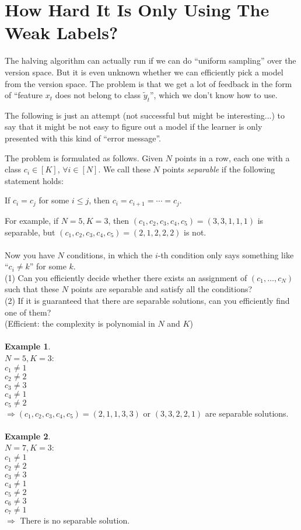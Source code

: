 \documentclass{article}
\begin{document}
\section{How Hard It Is Only Using The Weak Labels?}
The halving algorithm can actually run if we can do ``uniform sampling'' over the version space. But it is even unknown whether we can efficiently pick a model from the version space. The problem is that we get a lot of feedback in the form of ``feature $x_t$ does not belong to class $\tilde{y}_t$'', which we don't know how to use. 

The following is just an attempt (not successful but might be interesting...) to say that it might be not easy to figure out a model if the learner is only presented with this kind of ``error message''. 

The problem is formulated as follows. 
Given $N$ points in a row, each one with a class $c_i\in [K]$, $\forall i\in [N]$. We call these $N$ points \textit{separable} if the following statement holds: 
\begin{center}
    If $c_i=c_j$ for some $i\leq j$, then $c_i=c_{i+1}=\cdots=c_j$.
\end{center}
For example, if $N=5, K=3$, then $(c_1,c_2, c_3, c_4,c_5)=(3,3,1,1,1)$ is separable, but $(c_1,c_2,c_3,c_4,c_5)=(2,1,2,2,2)$ is not. 
\ \\
\ \\
Now you have $N$ conditions, in which the $i$-th condition only says something like ``$c_i\neq k$'' for some $k$. \\
(1) Can you efficiently decide whether there exists an assignment of $(c_1,\ldots,c_N)$ such that these $N$ points are separable and satisfy all the conditions? \\
(2) If it is guaranteed that there are separable solutions, can you efficiently find one of them?\\ (Efficient: the complexity is polynomial in $N$ and $K$)
\ \\
\ \\
\textbf{Example 1}. \\
$N=5, K=3$: \\
$c_1\neq 1$ \\
$c_2\neq 2$ \\
$c_3\neq 3$ \\
$c_4\neq 1$ \\
$c_5\neq 2$ \\
$\Rightarrow (c_1,c_2,c_3,c_4,c_5)=(2,1,1,3,3)$ or $(3,3,2,2,1)$ are separable solutions. \\
\ \\
\textbf{Example 2}. \\
$N=7, K=3$: \\
$c_1\neq 1$ \\
$c_2\neq 2$ \\
$c_3\neq 3$ \\
$c_4\neq 1$ \\
$c_5\neq 2$ \\
$c_6\neq 3$ \\
$c_7\neq 1$ \\
$\Rightarrow$ There is no separable solution. \\
\end{document}
